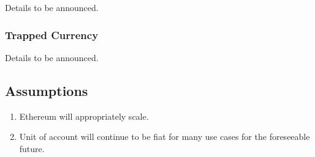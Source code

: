 Details to be announced. \\

\subsubsection{Trapped Currency}

Details to be announced. \\

\pagebreak
\subsection{Assumptions}

\begin{enumerate}
	\item Ethereum will appropriately scale.
	\item Unit of account will continue to be fiat for many use cases for the foreseeable future.
\end{enumerate}

\pagebreak